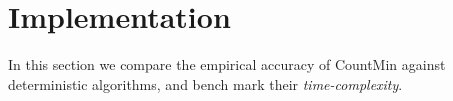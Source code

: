 
\def\H{\mathcal{H}}              
\section*{Implementation}


In this section we compare the empirical accuracy of CountMin against deterministic algorithms, and bench mark their \textit{time-complexity}. $$